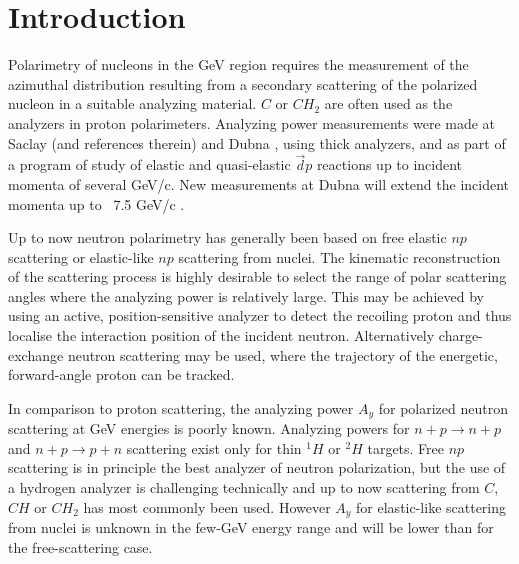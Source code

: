\documentclass[epj]{svjour}
\begin{document}
\maketitle
%
\section{Introduction}
\label{intro}


Polarimetry of nucleons in the GeV region requires the measurement of the azimuthal distribution resulting from a secondary scattering of the polarized nucleon in a suitable  analyzing material. $C$ or $CH_2$ are often used as the analyzers in proton polarimeters. Analyzing power measurements were made at Saclay \cite{Cheung:1995ei} (and references therein)  and Dubna \cite{Azhgirey:2004yk}, using thick analyzers, and as part of a program of study of elastic and quasi-elastic  $\vec d p$ reactions \cite{Azhgirey:2008} up to incident momenta of several GeV/c. New measurements at Dubna will extend the incident momenta up to ~7.5 GeV/c \cite{ALPOM2}.


Up to now neutron polarimetry has generally been based on free elastic $np$ scattering
or elastic-like $np$ scattering from nuclei. The kinematic reconstruction of the scattering process is highly desirable to select the range of polar scattering angles where the analyzing power is relatively large. This may be achieved by using an active, position-sensitive analyzer to detect the recoiling proton and thus localise the interaction position of the incident neutron. Alternatively charge-exchange neutron scattering may be used, where the trajectory of the energetic, forward-angle proton can be tracked. 

In comparison to proton scattering, the analyzing power $A_{y}$ for
polarized neutron scattering at GeV energies is poorly known. Analyzing powers for $n+p\to n+p$ and $n+p\to p+n$ scattering exist only for thin $^1H$ or $^2H$ targets.
Free $np$ scattering is in principle the best analyzer of neutron polarization,
but the use of a hydrogen analyzer is challenging technically and
up to now scattering from $C$, $CH$ or $CH_2$ 
has most commonly been used. However $A_{y}$ for elastic-like scattering
from nuclei is unknown in the few-GeV energy range and will be lower than for the free-scattering case. 
\end{document}
